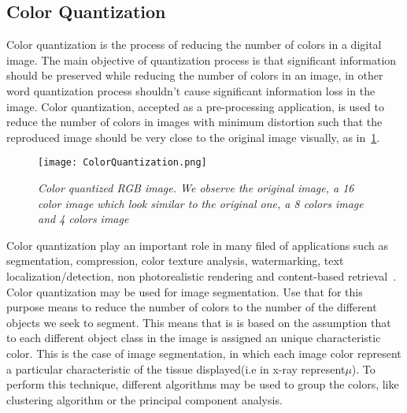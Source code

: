 \documentclass{standalone}
\begin{document}
	\subsection{Color Quantization}
	

	Color quantization is the process of reducing the number of colors in a digital image. The main objective of quantization process is that 
	significant information should be preserved while reducing the number of colors in an image, in other word quantization process shouldn’t cause 
	significant information loss in the image. 
	Color quantization, accepted as a pre-processing application, is used to reduce the number of colors in images with minimum distortion such that the 
	reproduced image should be very close to the original image visually, as in \figurename\,\ref{fig:ColorQuantization}. 

	\begin{figure}[h!]
		
		\centering
			\texttt{[image: ColorQuantization.png]}
		\caption{\textit{Color quantized RGB image. We observe the original image, a 16 color image which look similar to the original one, a 8 colors image and 4 colors image}}\label{fig:ColorQuantization}
	\end{figure}

	Color quantization play an important role in many filed of applications such as segmentation, compression, color texture analysis, watermarking, 
	text localization/detection, non photorealistic rendering and content-based retrieval~\cite{ART:Ozturk}.\\
	
	
	Color quantization may be used for image segmentation. Use that for this purpose means to reduce the number of colors to the number of the different objects we seek to segment. This means that is is based on the assumption that to each different object class in the image is assigned an unique characteristic color. This is the case of image segmentation, in which each image color represent a particular characteristic of the tissue displayed(i.e in x-ray represent$\mu$). 
	To perform this technique, different algorithms may be used to group the colors, like clustering algorithm or the principal component analysis.


	
	
	
	

	
	
\end{document}
